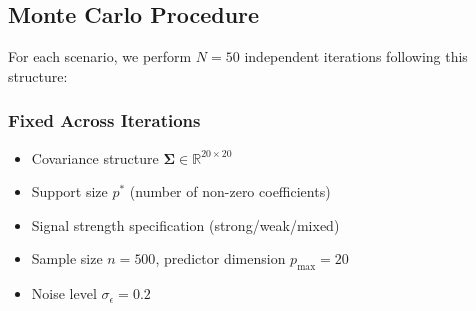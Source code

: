 \documentclass[11pt,a4paper]{article}
\begin{document}
\subsection{Monte Carlo Procedure}

For each scenario, we perform $N = 50$ independent iterations following this structure:

\subsubsection{Fixed Across Iterations}
\begin{itemize}
\item Covariance structure $\mathbf{\Sigma} \in \mathbb{R}^{20 \times 20}$
\item Support size $p^*$ (number of non-zero coefficients)
\item Signal strength specification (strong/weak/mixed)
\item Sample size $n = 500$, predictor dimension $p_{\max} = 20$
\item Noise level $\sigma_{\epsilon} = 0.2$
\end{itemize}
\end{document}

